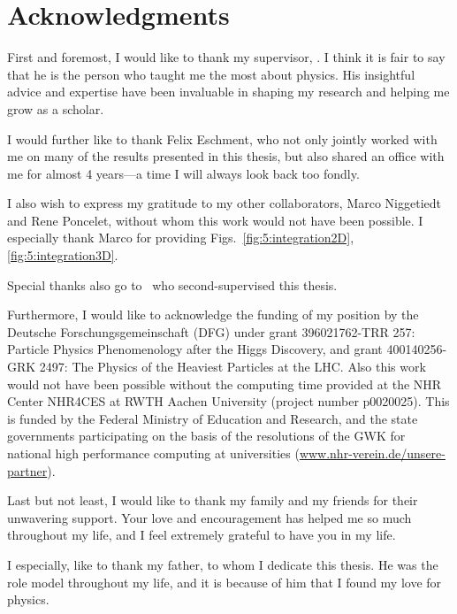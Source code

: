 
\begingroup
\let\clearpage\relax
\let\cleardoublepage\relax
\let\cleardoublepage\relax
\chapter*{Acknowledgments}

First and foremost, I would like to thank my supervisor, \mySupervisor. I think it is fair to say that he is the person who taught me the most about physics. His insightful advice and expertise have been invaluable in shaping my research and helping me grow as a scholar.

I would further like to thank Felix Eschment, who not only jointly worked with me on many of the results presented in this thesis, but also shared an office with me for almost 4 years---a time I will always look back too fondly.

I also wish to express my gratitude to my other collaborators, Marco Niggetiedt and Rene Poncelet, without whom this work would not have been possible. I especially thank Marco for providing Figs.~\ref{fig:5:integration2D}, \ref{fig:5:integration3D}.

Special thanks also go to \myOtherSupervisor\ who second-supervised this thesis.

Furthermore, I would like to acknowledge the funding of my position by the Deutsche Forschungsgemeinschaft (DFG) under grant 396021762-TRR 257: Particle Physics Phenomenology after the Higgs Discovery, and grant 400140256-GRK 2497: The Physics of the Heaviest Particles at the LHC. Also this work would not have been possible without the computing time provided at the NHR Center NHR4CES at RWTH Aachen University (project number p0020025). This is funded by the Federal Ministry of Education and Research, and the state governments participating on the basis of the resolutions of the GWK for national high performance computing at universities (\url{www.nhr-verein.de/unsere-partner}).

Last but not least, I would like to thank my family and my friends for their unwavering support. Your love and encouragement has helped me so much throughout my life, and I feel extremely grateful to have you in my life.

I especially, like to thank my father, to whom I dedicate this thesis. He was the role model throughout my life, and it is because of him that I found my love for physics.

\endgroup
